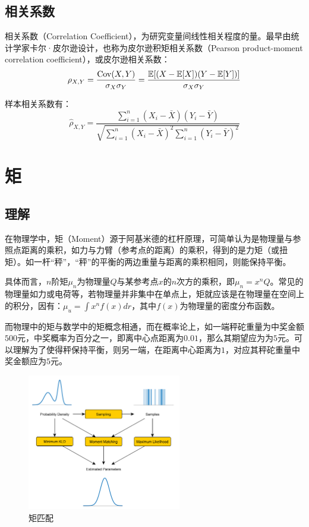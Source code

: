\documentclass[11pt]{article}
\begin{document}
\subsection{相关系数}

相关系数（Correlation Coefficient），为研究变量间线性相关程度的量。最早由统计学家卡尔·皮尔逊设计，也称为皮尔逊积矩相关系数（Pearson product-moment correlation coefficient），或皮尔逊相关系数：
\begin{equation*}
    \rho_{X,Y} = \frac{\operatorname{Cov}(X,Y)}{\sigma_X\sigma_Y}
    = \frac{\mathbb{E}[(X-\mathbb{E}[X])(Y-\mathbb{E}[Y])]}{\sigma_X\sigma_Y}
\end{equation*}

样本相关系数有：
\begin{equation*}
    \hat{\rho}_{X,Y} = \frac{\sum_{i=1}^{n}(X_i - \bar{X})(Y_i - \bar{Y})}{\sqrt{\sum_{i=1}^{n}(X_i - \bar{X})^2 \sum_{i=1}^{n}(Y_i - \bar{Y})^2}}
\end{equation*}

\section{矩}

\subsection{理解}

在物理学中，矩（Moment）源于阿基米德的杠杆原理，可简单认为是物理量与参照点距离的乘积，如力与力臂（参考点的距离）的乘积，得到的是力矩（或扭矩）。如一杆“秤”，“秤”的平衡的两边重量与距离的乘积相同，则能保持平衡。

具体而言，$n$阶矩$\mu_n$为物理量$Q$与某参考点$x$的$n$次方的乘积，即$\mu_n = x^n Q$。常见的物理量如力或电荷等，若物理量并非集中在单点上，矩就应该是在物理量在空间上的积分，因有：$\mu_u = \int x^n f(x) dr$，其中$f(x)$为物理量的密度分布函数。

而物理中的矩与数学中的矩概念相通，而在概率论上，如一端秤砣重量为中奖金额$500$元，中奖概率为百分之一，即离中心点距离为$0.01$，那么其期望应为为$5$元。可以理解为了使得秤保持平衡，则另一端，在距离中心距离为$1$，对应其秤砣重量中奖金额应为$5$元。

\begin{figure}[H]
    \centering
    \includegraphics[width=0.6\textwidth]{fig/moment-matching.png}
    \caption{矩匹配}
    \label{fig:moment-match}
\end{figure}
\end{document}

